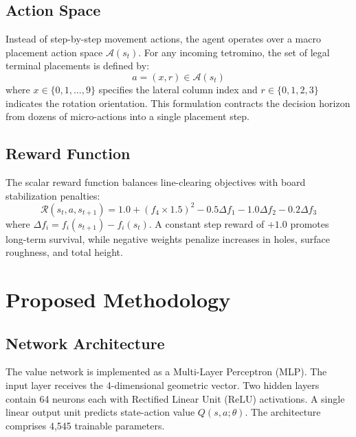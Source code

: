 \documentclass[runningheads]{llncs}
\begin{document}
\subsection{Action Space}
Instead of step-by-step movement actions, the agent operates over a macro placement action space $\mathcal{A}(s_t)$. For any incoming tetromino, the set of legal terminal placements is defined by:
\begin{equation}
a = (x, r) \in \mathcal{A}(s_t)
\end{equation}
where $x \in \{0, 1, \dots, 9\}$ specifies the lateral column index and $r \in \{0, 1, 2, 3\}$ indicates the rotation orientation. This formulation contracts the decision horizon from dozens of micro-actions into a single placement step.

\subsection{Reward Function}
The scalar reward function balances line-clearing objectives with board stabilization penalties:
\begin{equation}
\mathcal{R}(s_t, a, s_{t+1}) = 1.0 + (f_4 \times 1.5)^2 - 0.5 \Delta f_1 - 1.0 \Delta f_2 - 0.2 \Delta f_3
\end{equation}
where $\Delta f_i = f_i(s_{t+1}) - f_i(s_t)$. A constant step reward of $+1.0$ promotes long-term survival, while negative weights penalize increases in holes, surface roughness, and total height.

\section{Proposed Methodology}
\subsection{Network Architecture}
The value network is implemented as a Multi-Layer Perceptron (MLP). The input layer receives the 4-dimensional geometric vector. Two hidden layers contain 64 neurons each with Rectified Linear Unit (ReLU) activations. A single linear output unit predicts state-action value $Q(s, a; \theta)$. The architecture comprises 4,545 trainable parameters.
\end{document}
